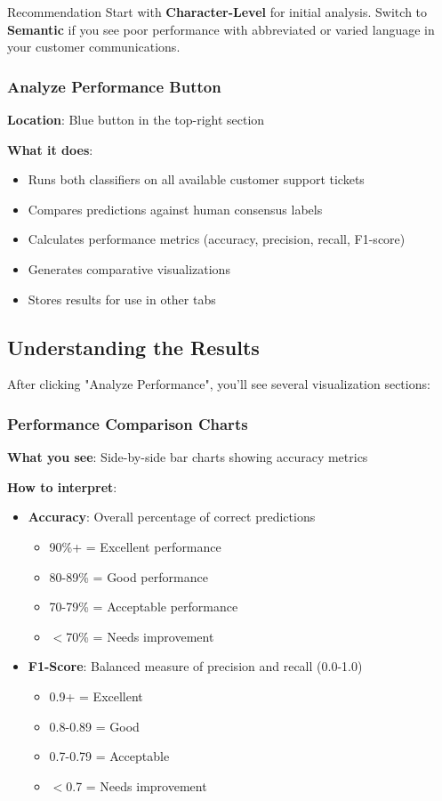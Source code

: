 \documentclass[11pt,a4paper]{article}
\begin{document}
\begin{tipbox}{Recommendation}
Start with \textbf{Character-Level} for initial analysis. Switch to \textbf{Semantic} if you see poor performance with abbreviated or varied language in your customer communications.
\end{tipbox}

\subsubsection{Analyze Performance Button}
\textbf{Location}: Blue button in the top-right section

\textbf{What it does}:
\begin{itemize}
    \item Runs both classifiers on all available customer support tickets
    \item Compares predictions against human consensus labels
    \item Calculates performance metrics (accuracy, precision, recall, F1-score)
    \item Generates comparative visualizations
    \item Stores results for use in other tabs
\end{itemize}

\subsection{Understanding the Results}

After clicking "Analyze Performance", you'll see several visualization sections:

\subsubsection{Performance Comparison Charts}
\textbf{What you see}: Side-by-side bar charts showing accuracy metrics

\textbf{How to interpret}:
\begin{itemize}
    \item \textbf{Accuracy}: Overall percentage of correct predictions
        \begin{itemize}
            \item 90\%+ = Excellent performance
            \item 80-89\% = Good performance
            \item 70-79\% = Acceptable performance
            \item $<$70\% = Needs improvement
        \end{itemize}
    \item \textbf{F1-Score}: Balanced measure of precision and recall (0.0-1.0)
        \begin{itemize}
            \item 0.9+ = Excellent
            \item 0.8-0.89 = Good
            \item 0.7-0.79 = Acceptable
            \item $<$0.7 = Needs improvement
        \end{itemize}
\end{itemize}
\end{document}
